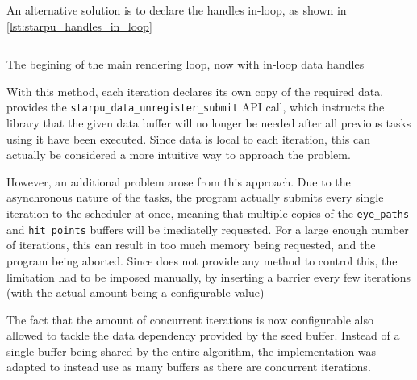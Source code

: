 \documentclass[main.tex]{subfiles}
\begin{document}
An alternative solution is to declare the handles in-loop, as shown in \cref{lst:starpu_handles_in_loop}

\begin{listing}[htp]
  \inputminted[linenos,tabsize=4]{c++}{code/starpu_handles_in_loop.cpp}

  \caption{The begining of the main rendering loop, now with in-loop data handles}
  \label{lst:starpu_handles_in_loop}
\end{listing}

With this method, each iteration declares its own copy of the required data. \starpu provides the \texttt{starpu_data_unregister_submit} API call, which instructs the library that the given data buffer will no longer be needed after all previous tasks using it have been executed. Since data is local to each iteration, this can actually be considered a more intuitive way to approach the problem.

However, an additional problem arose from this approach. Due to the asynchronous nature of the tasks, the program actually submits every single iteration to the scheduler at once, meaning that multiple copies of the \texttt{eye\_paths} and \texttt{hit\_points} buffers will be imediatelly requested. For a large enough number of iterations, this can result in too much memory being requested, and the program being aborted. Since \starpu does not provide any method to control this, the limitation had to be imposed manually, by inserting a barrier every few iterations (with the actual amount being a configurable value)

The fact that the amount of concurrent iterations is now configurable also allowed to tackle the data dependency provided by the seed buffer. Instead of a single buffer being shared by the entire algorithm, the implementation was adapted to instead use as many buffers as there are concurrent iterations.


\end{document}
